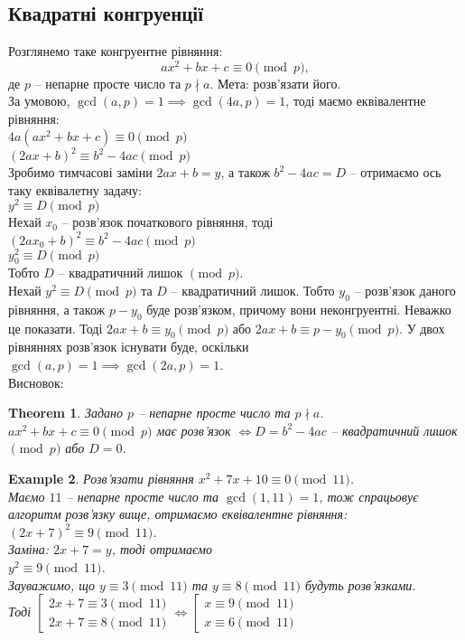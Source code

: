 \documentclass[a4paper, 14pt]{extarticle}
\theoremstyle{theoremdd}
\newtheorem{theorem}{Theorem}[subsection]
\theoremstyle{theoremdd}
\theoremstyle{theoremdd}
\theoremstyle{theoremdd}
\newtheorem{example}[theorem]{Example}
\theoremstyle{theoremdd}
\theoremstyle{theoremdd}
\theoremstyle{theoremdd}
\theoremstyle{theoremdd}
\begin{document}
\subsection{Квадратні конгруенції}
Розглянемо таке конгруентне рівняння:
$$ ax^2+bx+c \equiv 0 \pmod p,$$
де $p$ -- непарне просте число та $p \nmid a$. Мета: розв'язати його.\\
За умовою, $\gcd(a,p) = 1 \implies \gcd(4a,p) = 1$, тоді маємо еквівалентне рівняння:\\
$4a(ax^2+bx+c) \equiv 0 \pmod p$\\
$(2ax+b)^2 \equiv b^2-4ac \pmod p$\\
Зробимо тимчасові заміни $2ax+b = y$, а також $b^2-4ac = D$ -- отримаємо ось таку еквівалетну задачу:\\
$y^2 \equiv D \pmod p$
\bigskip \\
Нехай $x_0$ -- розв'язок початкового рівняння, тоді\\
$(2ax_0+b)^2 \equiv b^2 - 4ac \pmod p$\\
$y_0^2 \equiv D \pmod p$\\
Тобто $D$ -- квадратичний лишок $\pmod p$.
\bigskip \\
Нехай $y^2 \equiv D \pmod p$ та $D$ -- квадратичний лишок. Тобто $y_0$ -- розв'язок даного рівняння, а також $p-y_0$ буде розв'язком, причому вони неконгруентні. Неважко це показати. Тоді $2ax+b \equiv y_0 \pmod p$ або $2ax+b \equiv p-y_0 \pmod p$. У двох рівняннях розв'язок існувати буде, оскільки $\gcd(a,p) = 1 \implies \gcd(2a,p) = 1$.\\
Висновок:
\begin{theorem}
Задано $p$ -- непарне просте число та $p \nmid a$.\\
$ax^2+bx+c \equiv 0 \pmod p$ має розв'язок $\iff D = b^2-4ac$ -- квадратичний лишок $\pmod p$ або $D = 0$.
\end{theorem}

\begin{example}
Розв'язати рівняння $x^2+7x+10 \equiv 0 \pmod {11}$.\\
Маємо $11$ -- непарне просте число та $\gcd(1,11) = 1$, тож спрацьовує алгоритм розв'язку вище, отримаємо еквівалентне рівняння:\\
$(2x+7)^2 \equiv 9 \pmod {11}$.\\
Заміна: $2x+7 = y$, тоді отримаємо\\
$y^2 \equiv 9 \pmod {11}$.\\
Зауважимо, що $y \equiv 3 \pmod {11}$ та $y \equiv 8 \pmod {11}$ будуть розв'язками.\\
Тоді $\left[ \begin{gathered} 2x+7 \equiv 3 \pmod {11} \\ 2x+7 \equiv 8 \pmod {11} \end{gathered} \right. \iff \left[ \begin{gathered} x \equiv 9 \pmod {11} \\ x \equiv 6 \pmod {11} \end{gathered} \right.$
\end{example}
\newpage
\end{document}
